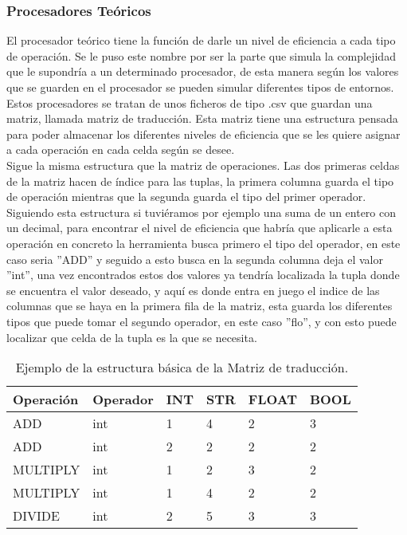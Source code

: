 \subsubsection{Procesadores Teóricos}
El procesador teórico tiene la función de darle un nivel de eficiencia a cada tipo de operación. Se le puso este nombre por ser la parte que simula la complejidad que le supondría a un determinado procesador, de esta manera según los valores que se guarden en el procesador se pueden simular diferentes tipos de entornos.\\

Estos procesadores se tratan de unos ficheros de tipo .csv que guardan una matriz, llamada matriz de traducción. Esta matriz tiene una estructura pensada para poder almacenar los diferentes niveles de eficiencia que se les quiere asignar a cada operación en cada celda según se desee.\\

Sigue la misma estructura que la matriz de operaciones. Las dos primeras celdas de la matriz hacen de índice para las tuplas, la primera columna guarda el tipo de operación mientras que la segunda guarda el tipo del primer operador. Siguiendo esta estructura si tuviéramos por ejemplo una suma de un entero con un decimal, para encontrar el nivel de eficiencia que habría que aplicarle a esta operación en concreto la herramienta busca primero el tipo del operador, en este caso seria ''ADD'' y seguido a  esto busca en la segunda columna deja el valor ''int'', una vez  encontrados  estos dos valores ya tendría localizada la tupla donde se encuentra  el valor  deseado, y aquí es donde  entra en juego el indice de las  columnas que se haya en la primera fila de la matriz, esta  guarda los diferentes tipos que puede tomar el segundo operador, en este caso ''flo'', y con esto puede localizar que celda de la tupla es la que se necesita.

\begin{table}[H]
\begin{center}
\begin{tabular}{|l|l|l|l|l|l|}
\hline
Operación & Operador & INT & STR & FLOAT & BOOL \\
\hline \hline
ADD & int & 1 & 4 & 2 & 3\\ \hline
ADD & int & 2 & 2 & 2 & 2 \\ \hline
MULTIPLY & int & 1 & 2 & 3 & 2 \\ \hline
MULTIPLY & int & 1 & 4 & 2 & 2 \\ \hline
DIVIDE & int & 2 & 5 & 3 & 3 \\ \hline
\end{tabular}
\caption{Ejemplo de la estructura básica de la Matriz de traducción.}

\label{tabla:sencilla}
\end{center}
\end{table}



